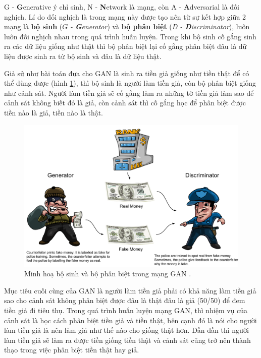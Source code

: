 \documentclass[a4paper, 12pt]{report}
\begin{document}
G - \textbf{G}enerative ý chỉ sinh, N - \textbf{N}etwork là mạng, còn A - \textbf{A}dversarial là đối nghịch.
Lí do đối nghịch là trong mạng này được tạo nên từ sự kết hợp giữa 2 mạng là \textbf{bộ sinh} ($G$ \textit{- \textbf{G}enerator}) và \textbf{bộ phân biệt} (\textit{D - \textbf{D}iscriminator}), luôn luôn đối nghịch nhau trong quá trình huấn luyện.
Trong khi bộ sinh cố gắng sinh ra các dữ liệu giống như thật thì bộ phân biệt lại cố gắng phân biệt đâu là dữ liệu được sinh ra từ bộ sinh và đâu là dữ liệu thật.\vspace{5pt}

Giả sử như bài toán đưa cho GAN là sinh ra tiền giả giống như tiền thật để có thể dùng được (hình \ref{fig:thiefandpolice}), thì bộ sinh là người làm tiền giả, còn bộ phân biệt giống như cảnh sát.
Người làm tiền giả sẽ cố gắng làm ra những tờ tiền giả làm sao để cảnh sát không biết đó là giả, còn cảnh sát thì cố gắng học để phân biệt được tiền nào là giả, tiền nào là thật.

\begin{figure}[!h]
\captionsetup{width=0.8\textwidth}
\centering
\includegraphics[width=15cm]{images/2_7.png}
\caption{Minh hoạ bộ sinh và bộ phân biệt trong mạng GAN \cite{richardgan2018}.}
\label{fig:thiefandpolice}
\end{figure}

Mục tiêu cuối cùng của GAN là người làm tiền giả phải có khả năng làm tiền giả sao cho cảnh sát không phân biệt được đâu là thật đâu là giả (50/50) để đem tiền giả đi tiêu thụ.
Trong quá trình huấn luyện mạng GAN, thì nhiệm vụ của cảnh sát là học cách phân biệt tiền giả và tiền thật, bên cạnh đó là nói cho người làm tiền giả là nên làm giả như thế nào cho giống thật hơn.
Dần dần thì người làm tiền giả sẽ làm ra được tiền giống tiền thật và cảnh sát cũng trở nên thành thạo trong việc phân biệt tiền thật hay giả.
\end{document}
